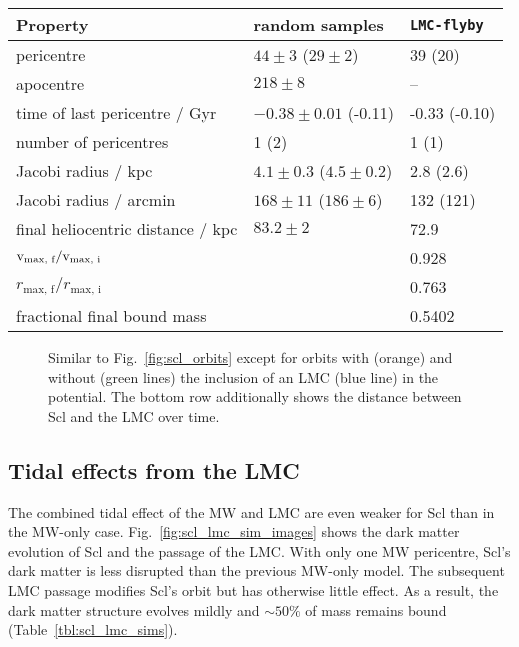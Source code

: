 \begin{table*}[t]
\centering
\caption[Orbits and results for Scl in the LMC potential.]{The orbital properties and dark matter evolution for the models including an LMC. Similar to Table \ref{tbl:scl_sim_results} except quantities with respect to the LMC are in parentheses. }
\label{tbl:scl_lmc_sims}
\begin{tabular}{lll}
\toprule
Property & random samples & \texttt{LMC-flyby}\\
\midrule
pericentre & $44\pm 3$ ($29 \pm 2$) & 39 (20)\\
apocentre & $218 \pm 8$ & –\\
time of last pericentre / Gyr & $-0.38\pm0.01$ (-0.11) & -0.33 (-0.10)\\
number of pericentres & 1 (2) & 1 (1)\\
Jacobi radius / kpc & $4.1\pm0.3$ ($4.5\pm0.2$) & 2.8 (2.6)\\
Jacobi radius / arcmin & $168 \pm 11$ ($186\pm6$) & 132 (121)\\
final heliocentric distance / kpc & $83.2\pm2$ & 72.9\\
${\rm v}_\textrm{max, f} / {\rm v}_\textrm{max, i}$ &  & 0.928\\
$r_\textrm{max, f} / r_\textrm{max, i}$ &  & 0.763\\
fractional final bound mass &  & 0.5402\\
\bottomrule
\end{tabular}
\end{table*}

\begin{figure}
\centering
{}
\caption[Sculptor orbits with LMC]{Similar to Fig.~\ref{fig:scl_orbits}
except for orbits with (orange) and without (green lines) the inclusion
of an LMC (blue line) in the potential. The bottom row additionally
shows the distance between Scl and the LMC over
time.}\label{fig:scl_lmc_orbits_effect}
\end{figure}

\subsection{Tidal effects from the
LMC}\label{tidal-effects-from-the-lmc}

The combined tidal effect of the MW and LMC are even weaker for Scl than
in the MW-only case. Fig.~\ref{fig:scl_lmc_sim_images} shows the dark
matter evolution of Scl and the passage of the LMC. With only one MW
pericentre, Scl's dark matter is less disrupted than the previous
MW-only model. The subsequent LMC passage modifies Scl's orbit but has
otherwise little effect. As a result, the dark matter structure evolves
mildly and \(\sim 50\%\) of mass remains bound
(Table~\ref{tbl:scl_lmc_sims}).

